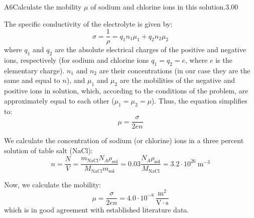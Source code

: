 \documentclass[11pt,a4paper]{article}
\begin{document}
\begin{solcard}{A6}{Calculate the mobility $\mu$ of sodium and chlorine ions in this solution.}{3.00}

The specific conductivity of the electrolyte is given by:
\[ \sigma = \frac{1}{\rho} = q_1n_1\mu_1 + q_2n_2\mu_2 \]
where $q_1$ and $q_2$ are the absolute electrical charges of the positive and negative ions, respectively (for sodium and chlorine ions $q_1 = q_2 = e$, where $e$ is the elementary charge). $n_1$ and $n_2$ are their concentrations (in our case they are the same and equal to $n$), and $\mu_1$ and $\mu_2$ are the mobilities of the negative and positive ions in solution, which, according to the conditions of the problem, are approximately equal to each other ($\mu_1 = \mu_2 = \mu$). Thus, the equation simplifies to:
\[ \mu = \frac{\sigma}{2en} \]

We calculate the concentration of sodium (or chlorine) ions in a three percent solution of table salt ($\text{NaCl}$):
\[ n = \frac{N}{V} = \frac{m_{\text{NaCl}} N_A \rho_{\text{sol}}}{M_{\text{NaCl}} m_{\text{sol}}} = 0.03 \frac{N_A \rho_{\text{sol}}}{M_{\text{NaCl}}} = 3.2\cdot 10^{26}~\mathrm{m}^{-3} \]

Now, we calculate the mobility:
\[ \mu = \frac{\sigma}{2en} = 4.0\cdot 10^{-8}~\frac{\mathrm{m}^2}{\mathrm{V}\cdot\mathrm{s}} \]
which is in good agreement with established literature data.

\end{solcard}
\end{document}
